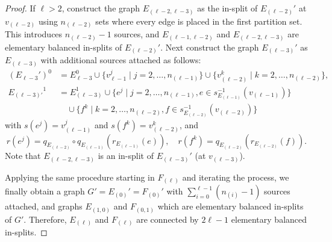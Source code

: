 \documentclass[12pt,a4paper,oneside,reqno,final]{amsart}
\theoremstyle{definition}
\numberwithin{equation}{section} %
\begin{document}
\begin{proof}
    If $\ell > 2$, construct the graph $E_{(\ell - 2, \ell - 3)}$ as the in-split of $E_{(\ell - 2)}'$ at $v_{(\ell - 2)}$ using $n_{(\ell - 2)}$ sets
    where every edge is placed in the first partition set.
    This introduces $n_{(\ell - 2)} - 1$ sources, and $E_{(\ell - 1, \ell - 2)}$ and $E_{(\ell - 2, \ell - 3)}$ are elementary balanced in-splits of $E_{(\ell - 2)}'$.
    Next construct the graph $E_{(\ell - 3)}'$ as $E_{(\ell - 3)}$ with additional sources attached as follows:
    \begin{align*}
        {(E_{\ell - 3}')}^0 &= 
        E_{\ell - 3}^0 \cup \{v_{\ell - 1}^j \mid j = 2,\ldots, n_{(\ell - 1)} \} \cup \{v_{(\ell - 2)}^k \mid k = 2,\ldots, n_{(\ell - 2)} \}, \\
        {E_{(\ell - 3)'}}^1 &=
            E_{(\ell - 3)}^1 \cup \{e^j \mid j = 2,\ldots, n_{(\ell - 1)}, e\in s_{E_{(\ell - 1)}}^{-1}(v_{(\ell - 1)}) \} \\
            & \quad \cup \{ f^k \mid k = 2,\ldots,n_{(\ell - 2)}, f\in s_{E_{(\ell - 2)}}^{-1}(v_{(\ell - 2)})\}
    \end{align*}
    with $s(e^j) = v_{(\ell - 1)}^j$ and $s(f^k) = v_{(\ell - 2)}^k$, and
    \[
        r(e^j) = q_{E_{(\ell - 2)}}\circ q_{E_{(\ell - 1)}}(r_{E_{(\ell - 1)}}(e)), \quad
        r(f^k) = q_{E_{(\ell - 2)}}(r_{E_{(\ell - 2)}}(f)).
    \]
    Note that $E_{(\ell - 2, \ell - 3)}$ is an in-split of $E_{(\ell - 3)}'$ (at $v_{(\ell - 3)}$).
    
    Applying the same procedure starting in $F_{(\ell)}$ and iterating the process, we finally obtain a graph $G' = E_{(0)}' = F_{(0)}'$ with $\sum_{i = 0}^{\ell - 1} (n_{(i)} - 1)$ sources attached,
    and graphs $E_{(1,0)}$ and $F_{(0,1)}$ which are elementary balanced in-splits of $G'$.
    Therefore, $E_{(\ell)}$ and $F_{(\ell)}$ are connected by $2 \ell - 1$ elementary balanced in-splits.
\end{proof}
\end{document}
